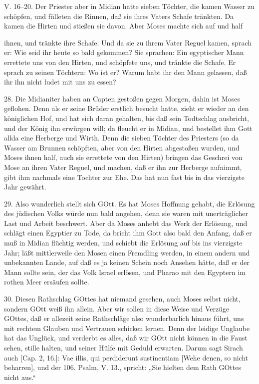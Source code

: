 \begin{schriftzitat}
V. 16–20. Der Priester aber in Midian hatte sieben Töchter, die kamen Wasser zu schöpfen, und fülleten die Rinnen, daß sie ihres Vaters Schafe tränkten. Da kamen die Hirten und stießen sie davon. Aber Moses machte sich auf und half
\end{schriftzitat}

ihnen, und tränkte ihre Schafe. Und da sie zu ihrem Vater Reguel kamen, sprach er: Wie seid ihr heute so bald gekommen? Sie sprachen: Ein egyptischer Mann errettete uns von den Hirten, und schöpfete uns, und tränkte die Schafe. Er sprach zu seinen Töchtern: Wo ist er? Warum habt ihr den Mann gelassen, daß ihr ihn nicht ludet mit uns zu essen?

28. Die Midianiter haben an Capten gestoßen gegen Morgen, dahin ist Moses geflohen. Denn als er seine Brüder erstlich besucht hatte, zieht er wieder an den königlichen Hof, und hat sich daran gehalten, bis daß sein Todtschlag ausbricht, und der König ihn erwürgen will; da fleucht er in Midian, und bestellet ihm Gott allda eine Herberge und Wirth. Denn die sieben Töchter des Priesters (so da Wasser am Brunnen schöpften, aber von den Hirten abgestoßen wurden, und Moses ihnen half, auch sie errettete von den Hirten) bringen das Geschrei von Mose an ihren Vater Reguel, und machen, daß er ihn zur Herberge aufnimmt, gibt ihm nachmals eine Tochter zur Ehe. Das hat nun fast bis in das vierzigste Jahr gewährt.

29. Also wunderlich stellt sich GOtt. Es hat Moses Hoffnung gehabt, die Erlösung des jüdischen Volks würde nun bald angehen, denn sie waren mit unerträglicher Last und Arbeit beschwert. Aber da Moses anhebt das Werk der Erlösung, und schlägt einen Egyptier zu Tode, da bricht ihm Gott also bald den Anfang, daß er muß in Midian flüchtig werden, und schiebt die Erlösung auf bis ins vierzigste Jahr; läßt mittlerweile den Mosen einen Fremdling werden, in einem andern und unbekannten Lande, auf daß es ja keinen Schein noch Ansehen hätte, daß er der Mann sollte sein, der das Volk Israel erlösen, und Pharao mit den Egyptern im rothen Meer ersäufen sollte.

30. Diesen Rathschlag GOttes hat niemand gesehen, auch Moses selbst nicht, sondern GOtt weiß ihn allein. Aber wir sollen in diese Weise und Verzüge GOttes, daß er allezeit seine Rathschläge also wunderbarlich hinaus führt, uns mit rechtem Glauben und Vertrauen schicken lernen. Denn der leidige Unglaube hat das Unglück, und verderbt es alles, daß wir GOtt nicht können in die Faust sehen, stille halten, und seiner Hülfe mit Geduld erwarten. Darum sagt Sirach auch [Cap. 2, 16.]: Vae illis, qui perdiderunt sustinentiam [Wehe denen, so nicht beharren], und der 106. Psalm, V. 13., spricht: „Sie hielten dem Rath GOttes nicht aus.“

